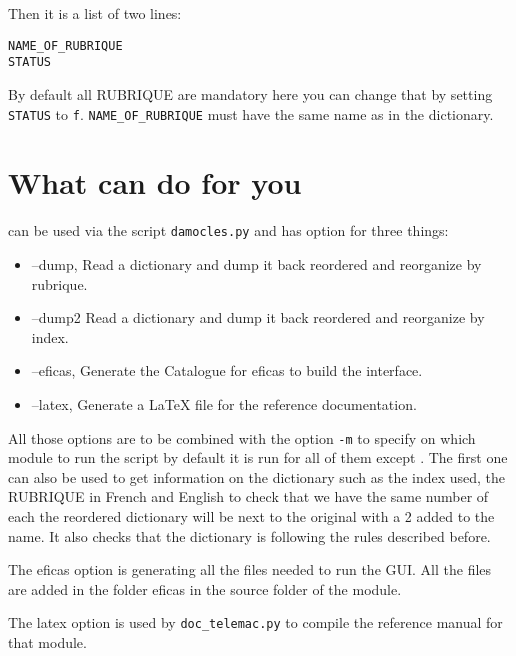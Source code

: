 Then it is a list of two lines:
\begin{verbatim}
NAME_OF_RUBRIQUE
STATUS
\end{verbatim}

By default all RUBRIQUE are mandatory here you can change that by setting
\verb!STATUS! to \verb!f!. \verb!NAME_OF_RUBRIQUE! must have the same name as
in the dictionary.

\section{What \damocles can do for you}

\damocles can be used via the script \verb!damocles.py! and has option for
three things:
\begin{itemize}
\item --dump, Read a dictionary and dump it back reordered and reorganize
  by rubrique.
\item --dump2 Read a dictionary and dump it back reordered and reorganize
  by index.
\item --eficas, Generate the Catalogue for eficas to build the interface.
\item --latex, Generate a LaTeX file for the reference documentation.
\end{itemize}
All those options are to be combined with the option \verb!-m! to specify on
which module to run the script by default it is run for all of them except
\mascaret.
The first one can also be used to get information on the dictionary such as the
index used, the RUBRIQUE in French and English to check that we have the same
number of each the reordered dictionary will be next to the original with a 2
added to the name. It also checks that the dictionary is following the rules
described before.

The eficas option is generating all the files needed to run the GUI. All the
files are added in the folder eficas in the source folder of the module.

The latex option is used by \verb!doc_telemac.py! to compile the reference
manual for that module.
